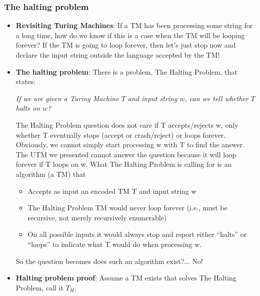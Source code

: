 \documentclass{report}
\begin{document}
    \subsubsection{The halting problem}
    \bigbreak \noindent 
    \begin{itemize}
        \item \textbf{Revisiting Turing Machines}: If a TM has been processing some string for a long time, how do we know if this is a case when the TM will be looping forever?
            \bigbreak \noindent 
            If the TM is going to loop forever, then let’s just stop now and declare the input string outside the language accepted by the TM!
        \item \textbf{The halting problem}: There is a problem, The Halting Problem, that states:
            \bigbreak \noindent 
            \begin{center}
                \textit{If we are given a Turing Machine $T$ and input string $w$, can we tell whether $T$ halts on $w$?}
            \end{center}
            \bigbreak \noindent 
            The Halting Problem question does not care if T accepts/rejects w, only whether T eventually stops (accept or crash/reject) or loops forever.
            \bigbreak \noindent 
            Obviously, we cannot simply start processing w with T to find the answer.
            \bigbreak \noindent 
            The UTM we presented cannot answer the question because it will loop forever if T loops on w.
            \bigbreak \noindent 
            What The Halting Problem is calling for is an algorithm (a TM) that
            \begin{itemize}
                \item Accepts as input an encoded TM T and input string w
                \item The Halting Problem TM would never loop forever (i.e., must be recursive, not merely recursively enumerable)
                \bigbreak \noindent 
            \item On all possible inputs it would always stop and report either “halts” or “loops” to indicate what T would do when processing w.
                \bigbreak \noindent 
            \end{itemize}
            So the question becomes does such an algorithm exist?... No!
            \bigbreak \noindent 
        \item \textbf{Halting problem proof}: Assume a TM exists that solves The Halting Problem, call it $T_{H}$.

\end{itemize}
\end{document}
